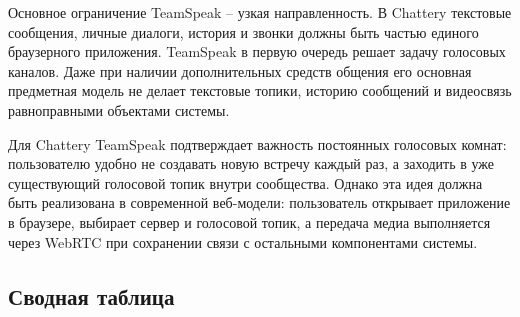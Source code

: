 \documentclass[a4paper,12pt]{extarticle}
\begin{document}
Основное ограничение TeamSpeak -- узкая направленность. В Chattery текстовые сообщения, личные диалоги, история и звонки должны быть частью единого браузерного приложения. TeamSpeak в первую очередь решает задачу голосовых каналов. Даже при наличии дополнительных средств общения его основная предметная модель не делает текстовые топики, историю сообщений и видеосвязь равноправными объектами системы.

Для Chattery TeamSpeak подтверждает важность постоянных голосовых комнат: пользователю удобно не создавать новую встречу каждый раз, а заходить в уже существующий голосовой топик внутри сообщества. Однако эта идея должна быть реализована в современной веб-модели: пользователь открывает приложение в браузере, выбирает сервер и голосовой топик, а передача медиа выполняется через WebRTC при сохранении связи с остальными компонентами системы.

\newpage

\subsection*{Сводная таблица}
\end{document}
